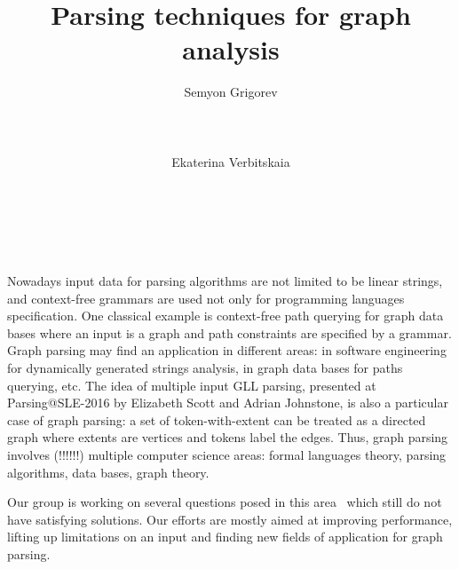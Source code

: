 \documentclass{vldb}
\begin{document}
\makeatletter
\def\@copyrightspace{\relax}
\makeatother


\title{Parsing techniques for graph analysis}



\author{
\alignauthor
       Semyon Grigorev\\
       \\
       \\
       \\
\alignauthor
       Ekaterina Verbitskaia\\
       \\
       \\
       \\
}


\maketitle
Nowadays input data for parsing algorithms are not limited to be linear strings, and context-free grammars are used not only for programming languages specification.
One classical example is context-free path querying for graph data bases where an input is a graph and path constraints are specified by a grammar.
Graph parsing may find an application in different areas: in software engineering for dynamically generated strings analysis, in graph data bases for paths querying, etc.
The idea of multiple input GLL parsing, presented at Parsing@SLE-2016 by Elizabeth Scott and Adrian Johnstone, is also a particular case of graph parsing: 
a set of token-with-extent can be treated as a directed graph where extents are vertices and tokens label the edges.
Thus, graph parsing involves (!!!!!!) multiple computer science areas: formal languages theory, parsing algorithms, data bases, graph theory.

Our group is working on several questions posed in this area~\cite{Hellings, Yannakakis} which still do not have satisfying solutions.
Our efforts are mostly aimed at improving performance, lifting up limitations on an input and finding new fields of application for graph parsing. 
\end{document}
